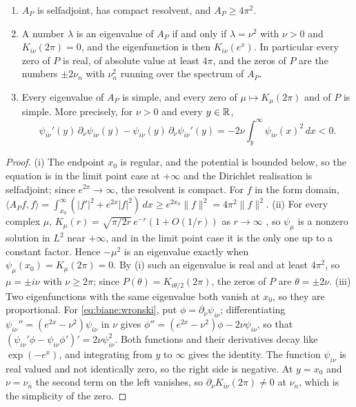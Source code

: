 \begin{proposition}\label{prop:biane:liouville}
\begin{enumerate}
\item[(i)] $A_P$ is selfadjoint, has compact resolvent, and $A_P\ge4\pi^2$.
\item[(ii)] A number $\lambda$ is an eigenvalue of $A_P$ if and only if $\lambda=\nu^2$ with $\nu>0$ and $K_{i\nu}(2\pi)=0$, and the eigenfunction is then $K_{i\nu}(e^x)$. In particular every zero of $P$ is real, of absolute value at least $4\pi$, and the zeros of $P$ are the numbers $\pm2\nu_n$ with $\nu_n^2$ running over the spectrum of $A_P$.
\item[(iii)] Every eigenvalue of $A_P$ is simple, and every zero of $\mu\mapsto K_\mu(2\pi)$ and of $P$ is simple. More precisely, for $\nu>0$ and every $y\in\mathbb{R}$,
\begin{equation}\label{eq:biane:wronski}
\psi_{i\nu}'(y)\,\partial_\nu\psi_{i\nu}(y)-\psi_{i\nu}(y)\,\partial_\nu\psi_{i\nu}'(y)=-2\nu\int_y^\infty\psi_{i\nu}(x)^2\,dx<0 .
\end{equation}
\end{enumerate}
\end{proposition}

\begin{proof}
(i) The endpoint $x_0$ is regular, and the potential is bounded below, so the equation is in the limit point case at $+\infty$ and the Dirichlet realisation is selfadjoint; since $e^{2x}\to\infty$, the resolvent is compact. For $f$ in the form domain, $\langle A_Pf,f\rangle=\int_{x_0}^\infty(|f'|^2+e^{2x}|f|^2)\,dx\ge e^{2x_0}\|f\|^2=4\pi^2\|f\|^2$. (ii) For every complex $\mu$, $K_\mu(r)=\sqrt{\pi/2r}\,e^{-r}(1+O(1/r))$ as $r\to\infty$ \cite[(10.40.2)]{DLMF}, so $\psi_\mu$ is a nonzero solution in $L^2$ near $+\infty$, and in the limit point case it is the only one up to a constant factor. Hence $-\mu^2$ is an eigenvalue exactly when $\psi_\mu(x_0)=K_\mu(2\pi)=0$. By (i) such an eigenvalue is real and at least $4\pi^2$, so $\mu=\pm i\nu$ with $\nu\ge2\pi$; since $P(\theta)=K_{i\theta/2}(2\pi)$, the zeros of $P$ are $\theta=\pm2\nu$. (iii) Two eigenfunctions with the same eigenvalue both vanish at $x_0$, so they are proportional. For \eqref{eq:biane:wronski}, put $\phi=\partial_\nu\psi_{i\nu}$; differentiating $\psi_{i\nu}''=(e^{2x}-\nu^2)\psi_{i\nu}$ in $\nu$ gives $\phi''=(e^{2x}-\nu^2)\phi-2\nu\psi_{i\nu}$, so that $(\psi_{i\nu}'\phi-\psi_{i\nu}\phi')'=2\nu\psi_{i\nu}^2$. Both functions and their derivatives decay like $\exp(-e^x)$, and integrating from $y$ to $\infty$ gives the identity. The function $\psi_{i\nu}$ is real valued and not identically zero, so the right side is negative. At $y=x_0$ and $\nu=\nu_n$ the second term on the left vanishes, so $\partial_\nu K_{i\nu}(2\pi)\ne0$ at $\nu_n$, which is the simplicity of the zero.
\end{proof}

